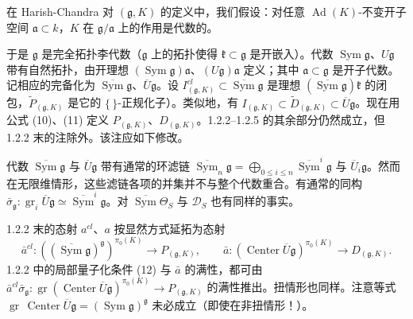 
在 Harish-Chandra 对 $(\mathfrak{g},K)$ 的定义中，我们假设：对任意 $\operatorname{Ad}(K)$-不变开子空间 $\mathfrak{a}\subset k$，$K$ 在 $\mathfrak{g}/\mathfrak{a}$ 上的作用是代数的。

于是 $\mathfrak{g}$ 是完全拓扑李代数（$\mathfrak{g}$ 上的拓扑使得 $\mathfrak{k}\subset\mathfrak{g}$ 是开嵌入）。代数 $\operatorname{Sym}\mathfrak{g}$、$U\mathfrak{g}$ 带有自然拓扑，由开理想 $(\operatorname{Sym}\mathfrak{g})\mathfrak{a}$、$(U\mathfrak{g})\mathfrak{a}$ 定义；其中 $\mathfrak{a}\subset\mathfrak{g}$ 是开子代数。记相应的完备化为 $\overline{\operatorname{Sym}}\mathfrak{g}$、$\overline{U}\mathfrak{g}$。设 $I^{cl}_{(\mathfrak{g},K)}\subset\overline{\operatorname{Sym}}\mathfrak{g}$ 是理想 $(\overline{\operatorname{Sym}}\mathfrak{g})\mathfrak{k}$ 的闭包，$\tilde{P}_{(\mathfrak{g},K)}$ 是它的 $\{\,\}$-正规化子）。类似地，有 $I_{(\mathfrak{g},K)}\subset\tilde{D}_{(\mathfrak{g},K)}\subset\overline{U}\mathfrak{g}$。现在用公式 (10)、(11) 定义 $P_{(\mathfrak{g},K)}$、$D_{(\mathfrak{g},K)}$。1.2.2--1.2.5 的其余部分仍然成立，但 1.2.2 末的注除外。该注应如下修改。

 代数 $\overline{\operatorname{Sym}}\mathfrak{g}$ 与 $\overline{U}\mathfrak{g}$ 带有通常的环滤链 $\overline{\operatorname{Sym}}_n\mathfrak{g}=\bigoplus_{0\le i\le n}\overline{\operatorname{Sym}}^{i}\mathfrak{g}$ 与 $\overline{U}_i\mathfrak{g}$。然而在无限维情形，这些滤链各项的并集并不与整个代数重合。有通常的同构 $\bar{\sigma}_{\mathfrak{g}}:\operatorname{gr}_i\overline{U}\mathfrak{g}\simeq\overline{\operatorname{Sym}}^{i}\mathfrak{g}$。对 $\overline{\operatorname{Sym}}\Theta_S$ 与 $\mathcal{D}_S$ 也有同样的事实。

1.2.2 末的态射 $a^{cl}$、$a$ 按显然方式延拓为态射
\begin{equation}\tag{17}
\bar{a}^{cl}:((\overline{\operatorname{Sym}}\mathfrak{g})^{\mathfrak{g}})^{\pi_0(K)}\to P_{(\mathfrak{g},K)},\qquad
\bar{a}:(\operatorname{Center}\overline{U}\mathfrak{g})^{\pi_0(K)}\to D_{(\mathfrak{g},K)}.
\end{equation}
1.2.2 中的局部量子化条件 (12) 与 $\bar{a}$ 的满性，都可由 $\bar{a}^{cl}\bar{\sigma}_{\mathfrak{g}}:\operatorname{gr}(\operatorname{Center}\overline{U}\mathfrak{g})^{\pi_0(K)}\to P_{(\mathfrak{g},K)}$ 的满性推出。扭情形也同样。注意等式 $\operatorname{gr}\,\operatorname{Center}\overline{U}\mathfrak{g}=(\operatorname{Sym}\mathfrak{g})^{\mathfrak{g}}$ 未必成立（即使在非扭情形！）。
